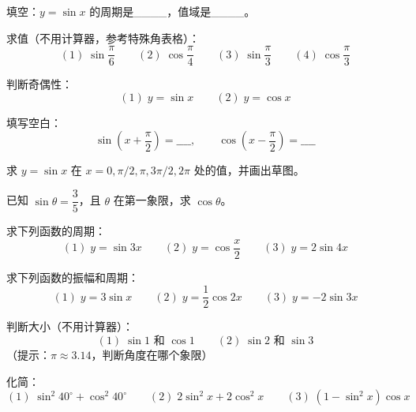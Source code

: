 \begin{exercise}[0]
填空：\(y = \sin x\) 的周期是\_\_\_\_，值域是\_\_\_\_。
\end{exercise}


\begin{exercise}[1]
求值（不用计算器，参考特殊角表格）：
\[
(1)\; \sin \frac{\pi}{6} \qquad (2)\; \cos \frac{\pi}{4} \qquad (3)\; \sin \frac{\pi}{3} \qquad (4)\; \cos \frac{\pi}{3}
\]
\end{exercise}

\begin{exercise}[1]
判断奇偶性：
\[
(1)\; y = \sin x \qquad (2)\; y = \cos x
\]
\end{exercise}

\begin{exercise}[1]
填写空白：
\[
\sin\left(x + \frac{\pi}{2}\right) = \_\_\_\_ , \qquad
\cos\left(x - \frac{\pi}{2}\right) = \_\_\_\_
\]
\end{exercise}

\begin{exercise}[1]
求 \(y = \sin x\) 在 \(x = 0, \pi/2, \pi, 3\pi/2, 2\pi\) 处的值，并画出草图。
\end{exercise}


\begin{exercise}[2]
已知 \(\sin \theta = \dfrac{3}{5}\)，且 \(\theta\) 在第一象限，求 \(\cos \theta\)。
\end{exercise}

\begin{exercise}[2]
求下列函数的周期：
\[
(1)\; y = \sin 3x \qquad (2)\; y = \cos \frac{x}{2} \qquad (3)\; y = 2\sin 4x
\]
\end{exercise}

\begin{exercise}[2]
求下列函数的振幅和周期：
\[
(1)\; y = 3\sin x \qquad (2)\; y = \frac{1}{2}\cos 2x \qquad (3)\; y = -2\sin 3x
\]
\end{exercise}

\begin{exercise}[2]
判断大小（不用计算器）：
\[
(1)\; \sin 1 \text{ 和 } \cos 1 \qquad
(2)\; \sin 2 \text{ 和 } \sin 3
\]
（提示：\(\pi \approx 3.14\)，判断角度在哪个象限）
\end{exercise}


\begin{exercise}[3]
化简：
\[
(1)\; \sin^2 40^\circ + \cos^2 40^\circ \qquad
(2)\; 2\sin^2 x + 2\cos^2 x \qquad
(3)\; (1 - \sin^2 x)\cos x
\]
\end{exercise}

